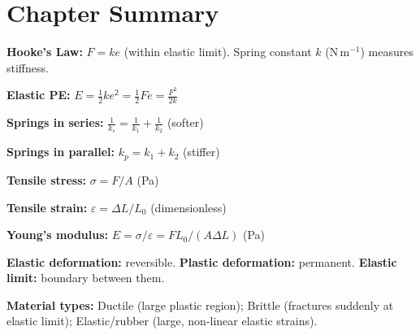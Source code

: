 \section{Chapter Summary}

\begin{summarybox}
\textbf{Hooke's Law:} $F = ke$ (within elastic limit).
Spring constant $k$ (N\,m$^{-1}$) measures stiffness.

\textbf{Elastic PE:}
$E = \frac{1}{2}ke^2 = \frac{1}{2}Fe = \frac{F^2}{2k}$

\textbf{Springs in series:}
$\frac{1}{k_s} = \frac{1}{k_1} + \frac{1}{k_2}$
(softer)

\textbf{Springs in parallel:}
$k_p = k_1 + k_2$ (stiffer)

\textbf{Tensile stress:}
$\sigma = F/A$ (Pa)

\textbf{Tensile strain:}
$\varepsilon = \Delta L/L_0$ (dimensionless)

\textbf{Young's modulus:}
$E = \sigma/\varepsilon = FL_0/(A\Delta L)$ (Pa)

\textbf{Elastic deformation:} reversible.
\textbf{Plastic deformation:} permanent.
\textbf{Elastic limit:} boundary between them.

\textbf{Material types:}
Ductile (large plastic region);
Brittle (fractures suddenly at elastic limit);
Elastic/rubber (large, non-linear elastic strains).
\end{summarybox}

